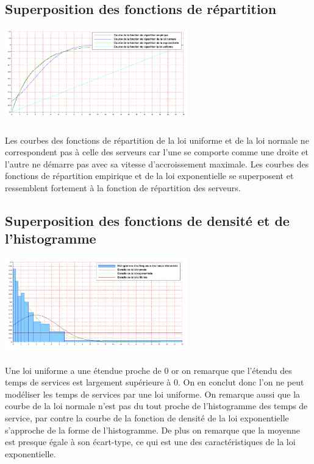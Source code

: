 \documentclass{article}
\begin{document}
\subsection{Superposition des fonctions de répartition}
\begin{center}
\includegraphics[width=300px]{img/repartitions.png}
\end{center}
\paragraph{}
Les courbes des fonctions de répartition de la loi uniforme et de la loi normale ne correspondent pas à celle des serveurs car l’une se comporte comme une droite et l’autre ne démarre pas avec sa vitesse d’accroissement maximale.
Les courbes des fonctions de répartition empirique et de la loi exponentielle se superposent et ressemblent fortement à la fonction de répartition des serveurs.


\subsection{Superposition des fonctions de densité et de l'histogramme}
\begin{center}
\includegraphics[width=300px]{img/densite.png}
\end{center}
\paragraph{}
Une loi uniforme a une étendue proche de 0 or on remarque que l’étendu des temps de services est largement supérieure à 0. On en conclut donc l’on ne peut modéliser les temps de services par une loi uniforme. On remarque aussi que la courbe de la loi normale n’est pas du tout proche de l’histogramme des temps de service, par contre la courbe de la fonction de densité de la loi exponentielle s’approche de la forme de l’histogramme. De plus on remarque que la moyenne est presque égale à son écart-type, ce qui est une des caractéristiques de la loi exponentielle.
\end{document}
